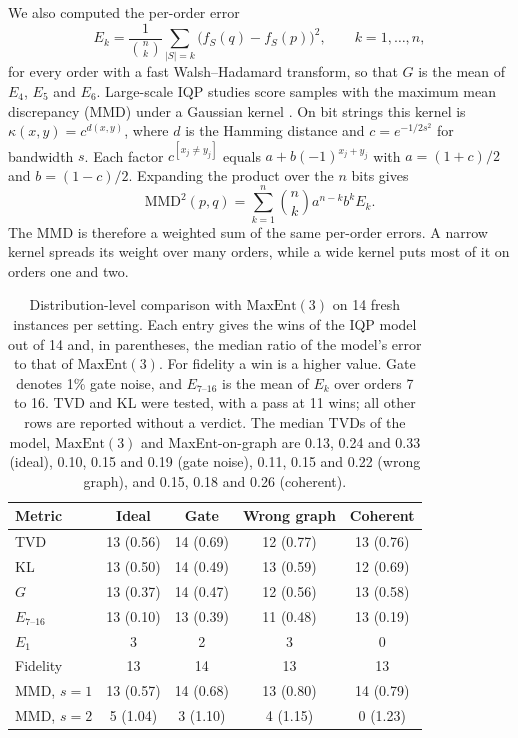 \documentclass[aps,pra,twocolumn,superscriptaddress,nofootinbib]{revtex4-2}
\newcommand{\Gm}{G}
\newcommand{\ME}{\mathrm{MaxEnt}(3)}
\begin{document}
We also computed the per-order error
\begin{equation}
  E_k = \frac{1}{\binom{n}{k}}\sum_{|S|=k}\bigl(f_S(q)-f_S(p)\bigr)^2, \qquad k=1,\dots,n,
\end{equation}
for every order with a fast Walsh--Hadamard transform, so that $\Gm$ is the mean of $E_4$, $E_5$ and $E_6$.
Large-scale IQP studies score samples with the maximum mean discrepancy (MMD) under a Gaussian kernel
\cite{recio2025train}.
On bit strings this kernel is $\kappa(x,y)=c^{d(x,y)}$, where $d$ is the Hamming distance and $c=e^{-1/2s^2}$ for
bandwidth $s$.
Each factor $c^{[x_j\ne y_j]}$ equals $a+b(-1)^{x_j+y_j}$ with $a=(1+c)/2$ and $b=(1-c)/2$.
Expanding the product over the $n$ bits gives
\begin{equation}
  \mathrm{MMD}^2(p,q) = \sum_{k=1}^{n}\binom{n}{k}a^{n-k}b^{k}E_k .
  \label{eq:mmd}
\end{equation}
The MMD is therefore a weighted sum of the same per-order errors.
A narrow kernel spreads its weight over many orders, while a wide kernel puts most of it on orders one and two.

\begin{table}[t]
\caption{Distribution-level comparison with $\ME$ on 14 fresh instances per setting. Each entry gives the wins of the
IQP model out of 14 and, in parentheses, the median ratio of the model's error to that of $\ME$. For fidelity a win is
a higher value. Gate denotes 1\% gate noise, and $E_{7\text{--}16}$ is the mean of $E_k$ over orders 7 to 16. TVD and
KL were tested, with a pass at 11 wins; all other rows are reported without a verdict. The
median TVDs of the model, $\ME$ and MaxEnt-on-graph are 0.13, 0.24 and 0.33 (ideal), 0.10, 0.15 and 0.19 (gate
noise), 0.11, 0.15 and 0.22 (wrong graph), and 0.15, 0.18 and 0.26 (coherent).}
\label{tab:sampling}
\begin{ruledtabular}
\begin{tabular}{lcccc}
Metric & Ideal & Gate & Wrong graph & Coherent \\
\hline
TVD & 13 (0.56) & 14 (0.69) & 12 (0.77) & 13 (0.76) \\
KL & 13 (0.50) & 14 (0.49) & 13 (0.59) & 12 (0.69) \\
$\Gm$ & 13 (0.37) & 14 (0.47) & 12 (0.56) & 13 (0.58) \\
$E_{7\text{--}16}$ & 13 (0.10) & 13 (0.39) & 11 (0.48) & 13 (0.19) \\
$E_1$ & 3 & 2 & 3 & 0 \\
Fidelity & 13 & 14 & 13 & 13 \\
MMD, $s=1$ & 13 (0.57) & 14 (0.68) & 13 (0.80) & 14 (0.79) \\
MMD, $s=2$ & 5 (1.04) & 3 (1.10) & 4 (1.15) & 0 (1.23) \\
\end{tabular}
\end{ruledtabular}
\end{table}
\end{document}
